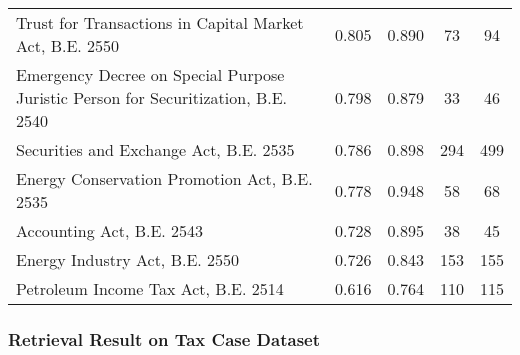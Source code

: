 \begin{table}[]
{\begin{tabular}{@{}p{}cccc@{}}
Trust for Transactions in Capital Market Act, B.E. 2550                                                                               & 0.805                            & 0.890                         & 73                          & 94                                \\
Emergency Decree on Special Purpose Juristic Person for Securitization, B.E. 2540                                                     & 0.798                            & 0.879                         & 33                          & 46                                \\
Securities and Exchange Act, B.E. 2535                                                                                                & 0.786                            & 0.898                         & 294                         & 499                               \\
Energy Conservation Promotion Act, B.E. 2535                                                                                          & 0.778                            & 0.948                         & 58                          & 68                                \\
Accounting Act, B.E. 2543                                                                                                             & 0.728                            & 0.895                         & 38                          & 45                                \\
Energy Industry Act, B.E. 2550                                                                                                        & 0.726                            & 0.843                         & 153                         & 155                               \\
Petroleum Income Tax Act, B.E. 2514                                                                                                   & 0.616                            & 0.764                         & 110                         & 115                               \\ \bottomrule

\end{tabular}
}
\end{table}

\subsubsection{Retrieval Result on Tax Case Dataset}
\label{subsubsec:re_result_tax}

